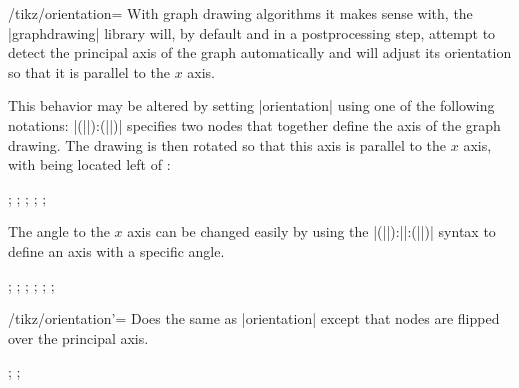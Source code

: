 \begin{key}{/tikz/orientation=}
  With graph drawing algorithms it makes sense with, the |graphdrawing|
  library will, by default and in a postprocessing step, attempt to
  detect the principal axis of the graph automatically and will adjust
  its orientation so that it is parallel to the $x$ axis.

  This behavior may be altered by setting |orientation| using one of
  the following notations:
  |(||):(||)| specifies
  two nodes that together define the axis of the graph drawing. The
  drawing is then rotated so that this axis is parallel to the $x$
  axis, with  being located left of :
  \begin{codeexample}[]
\tikz {};
\tikz {};
\tikz {};
\tikz {};
\tikz {};
  \end{codeexample}
  The angle to the $x$ axis can be changed easily by using the
  |(||):||:(||)|
  syntax to define an axis with a specific angle.
  \begin{codeexample}[]
\tikz {};
\tikz {};
\tikz {};
\tikz {};
\tikz {};
\tikz {};
  \end{codeexample}
\end{key}

\begin{key}{/tikz/orientation'=}
  Does the same as |orientation| except that nodes are flipped over the
  principal axis.
  \begin{codeexample}[]
\tikz {};
\tikz {};
  \end{codeexample}
\end{key}

